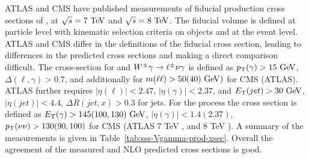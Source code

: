 ATLAS and CMS have published measurements of fiducial production cross sections of
\Wglvg, \Zgllg at $\rts=7\TeV$ and $\rts=8\TeV$. 
The fiducial volume is defined at particle level with kinematic selection criteria 
on objects and at the event level. ATLAS and CMS differ in the definitions 
of the fiducial cross section, leading to differences in the predicted cross sections
and making a direct comparison difficult. 
The cross-section for \Zgllg\; and $W^{\pm}\gamma \rightarrow \ell^\pm \nu \gamma $ is defined as 
$\pt(\gamma)>15\GeV$,$\Delta(\ell,\gamma)>0.7$, and additionally for \Zg\; $m(\ell\ell)>50 (40) \GeV)$ 
for CMS (ATLAS). ATLAS further requires $|\eta(\ell)|<2.47$,  $|\eta(\gamma)|<2.37$, and 
$\ET(jet) >30\GeV$, $|\eta(jet)|<4.4$, $\Delta R (jet,x) > 0.3$ for jets. 
For the \Zgvvg\; process the cross section is defined as $\ET(\gamma)>145 (100, 130)\GeV$, 
$|\eta(\gamma)|<1.4(2.37)$, $p_{\mathrm{T}}(\nu\nu)>130(90, 100)$ for CMS (ATLAS 7 TeV \cite{Chatrchyan:2013nda}, and 8 TeV \cite{Aad:2016sau}).
A summary of the measurements is given in Table~\ref{tab:sss-Vgamma-prod-xsec}. Overall the agreement
of the measured and NLO predicted cross sections is good. 

